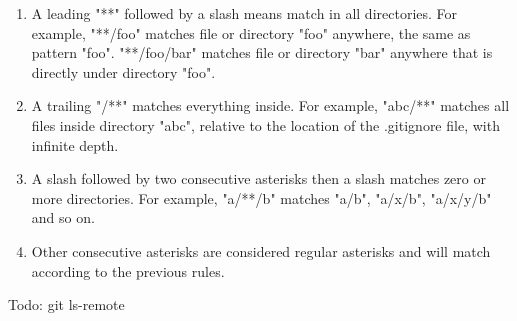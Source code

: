 \documentclass{charun}
\begin{document}
\begin{enumerate}
\item A leading "**" followed by a slash means match in all directories. For example, "**/foo" matches file or directory "foo" anywhere, the same as pattern "foo". "**/foo/bar" matches file or directory "bar" anywhere that is directly under directory "foo".
\item A trailing "/**" matches everything inside. For example, "abc/**" matches all files inside directory "abc", relative to the location of the .gitignore file, with infinite depth.
\item A slash followed by two consecutive asterisks then a slash matches zero or more directories. For example, "a/**/b" matches "a/b", "a/x/b", "a/x/y/b" and so on.
\item Other consecutive asterisks are considered regular asterisks and will match according to the previous rules.
\end{enumerate}

Todo: git ls-remote
\end{document}
